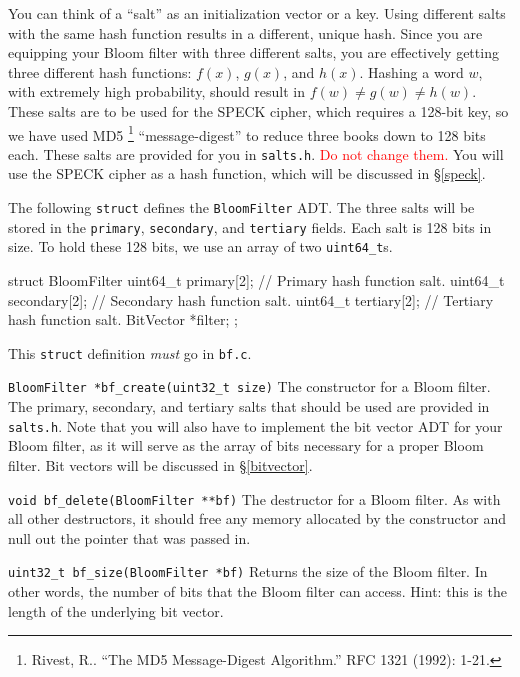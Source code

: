 You can think of a ``salt'' as an initialization vector or a key. Using
different salts with the same hash function results in a different,
unique hash. Since you are equipping your Bloom filter with three
different salts, you are effectively getting three different hash
functions: $f(x)$, $g(x)$, and $h(x)$. Hashing a word $w$, with
extremely high probability, should result in $f(w) \ne g(w) \ne h(w)$.
These salts are to be used for the SPECK cipher, which requires a
128-bit key, so we have used MD5 \footnote{Rivest, R.. “The MD5
Message-Digest Algorithm.” RFC 1321 (1992): 1-21.} ``message-digest'' to
reduce three books down to 128 bits each. These salts are provided for
you in \texttt{salts.h}. \textcolor{red}{Do not change them.} You will
use the SPECK cipher as a hash function, which will be discussed in
\S\ref{speck}.

The following \texttt{struct} defines the \texttt{BloomFilter} ADT. The
three salts will be stored in the \texttt{primary}, \texttt{secondary},
and \texttt{tertiary} fields. Each salt is 128 bits in size. To hold
these 128 bits, we use an array of two \texttt{uint64\_t}s.

\begin{clisting}{}
struct BloomFilter {
  uint64_t primary[2];   // Primary hash function salt.
  uint64_t secondary[2]; // Secondary hash function salt.
  uint64_t tertiary[2];  // Tertiary hash function salt.
  BitVector *filter;
};
\end{clisting}

This \texttt{struct} definition \emph{must} go in \texttt{bf.c}.

\begin{funcdoc}{\texttt{BloomFilter *bf\_create(uint32\_t size)}}
  The constructor for a Bloom filter. The primary, secondary, and
  tertiary salts that should be used are provided in \texttt{salts.h}.
  Note that you will also have to implement the bit vector ADT for your
  Bloom filter, as it will serve as the array of bits necessary for a
  proper Bloom filter. Bit vectors will be discussed in
  \S\ref{bitvector}.
\end{funcdoc}

\begin{funcdoc}{\texttt{void bf\_delete(BloomFilter **bf)}}
  The destructor for a Bloom filter. As with all other destructors, it
  should free any memory allocated by the constructor and null out the
  pointer that was passed in.
\end{funcdoc}

\begin{funcdoc}{\texttt{uint32\_t bf\_size(BloomFilter *bf)}}
  Returns the size of the Bloom filter. In other words, the number of
  bits that the Bloom filter can access. Hint: this is the length of the
  underlying bit vector.
\end{funcdoc}

